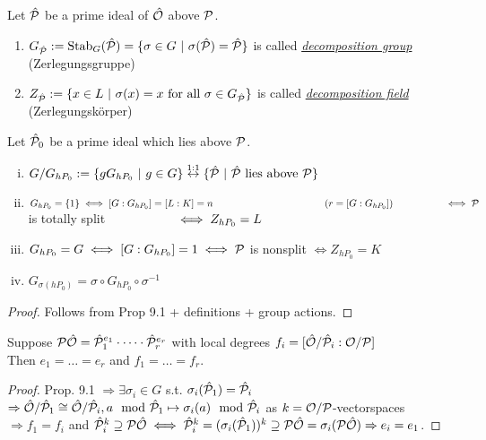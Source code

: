 \begin{defi}
Let $\hat{\mathcal{P}}$ be a prime ideal of $\hat{\mathcal{O}}$ above $\mathcal{P}$.
\begin{enumerate}
\item $G_{\hat{\mathcal{P}}} := \operatorname{Stab}_G(\hat{\mathcal{P}})=\{\sigma \in G \ | \ \sigma(\hat{\mathcal{P}})=\hat{\mathcal{P}}\}$ is called \emph{\underline{decomposition group}} (\glqq Zerlegungsgruppe\grqq)
\item $Z_{\hat{\mathcal{P}}} := \{ x \in L \ | \ \sigma(x) = x \text{ for all } \sigma \in G_{\hat{\mathcal{P}}}\}$ is called \emph{\underline{decomposition field}} (\glqq Zerlegungskörper\grqq)
\end{enumerate}
\end{defi}

\begin{Bem}
Let $\hat{\mathcal{P}}_0$ be a prime ideal which lies above $\mathcal{P}$.
\begin{enumerate}[i)]
\item $G/G_{hP_0}:=\{gG_{hP_0} \ | \ g \in G\} \stackrel{1:1}{\leftrightarrow} \{\hat{\mathcal{P}} \ | \ \hat{\mathcal{P}} \text{ lies above } \mathcal{P}\}$
\item $G_{hP_0}=\{1\} \iff [G:G_{hP_0}]=[L:K]=n \hspace*{4cm} (r=[G:G_{hP_0}])\\
 \phantom{G_{hP_0}=\{1\}}\iff \PP$ is totally split $\\
 \phantom{G_{hP_0}=\{1\}}\iff Z_{hP_0} =L$
\item $G_{hP_0}=G \iff [G:G_{hP_0}]=1 \iff \mathcal{P}$ is nonsplit $\iff Z_{hP_0} =K$
\item $G_{\sigma(hP_0)}=\sigma \circ G_{hP_0} \circ \sigma^{-1}$
\end{enumerate}
\end{Bem}
\begin{proof}
Follows from Prop 9.1 + definitions + group actions.
\end{proof}

\begin{Bem}
Suppose $\mathcal{P} \hat{\mathcal{O}} = \hat{\mathcal{P}}_1^{e_1}\cdot \dots \cdot \hat{\mathcal{P}}_r^{e_r}$ with local degrees $f_i=[\hat{\mathcal{O}}/\hat{\mathcal{P}}_i : \mathcal{O}/\mathcal{P}]$\\
Then $e_1=\dots=e_r$ and $f_1=\dots=f_r$.
\end{Bem}
\begin{proof}
Prop. 9.1 $\Rightarrow \exists \sigma_i \in G$ s.t. $\sigma_i(\hat{\mathcal{P}}_1)=\hat{\mathcal{P}}_i$\\
$\Rightarrow \hat{\mathcal{O}}/\hat{\mathcal{P}}_1 \cong \hat{\mathcal{O}}/\hat{\mathcal{P}}_i, a \mod {\hat{\mathcal{P}}}_1 \mapsto \sigma_i(a) \mod {\hat{\mathcal{P}}}_i$ as $k=\mathcal{O}/\mathcal{P}$-vectorspaces $\Rightarrow f_1=f_i$ and $\hat{\mathcal{P}}_i^k \supseteq \mathcal{P}\hat{\mathcal{O}} \iff \hat{\mathcal{P}}_i^k = (\sigma_i(\hat{\mathcal{P}}_1))^k \supseteq \mathcal{P}\hat{\mathcal{O}}=\sigma_i(\mathcal{P} \hat{\mathcal{O}}) \Rightarrow e_i = e_1$.
\end{proof}


